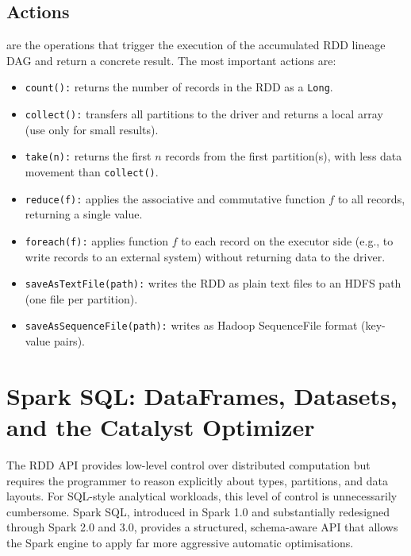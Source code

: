 \subsection{Actions}
\label{subsec:actions}

 are the operations that trigger the execution of the
accumulated RDD lineage DAG and return a concrete result. The most
important actions are:

\begin{itemize}
  \item \texttt{count():} returns the number of records in the RDD as a
        \texttt{Long}.
  \item \texttt{collect():} transfers all partitions to the driver and
        returns a local array (use only for small results).
  \item \texttt{take(n):} returns the first $n$ records from the first
        partition(s), with less data movement than \texttt{collect()}.
  \item \texttt{reduce(f):} applies the associative and commutative
        function $f$ to all records, returning a single value.
  \item \texttt{foreach(f):} applies function $f$ to each record on
        the executor side (e.g., to write records to an external system)
        without returning data to the driver.
  \item \texttt{saveAsTextFile(path):} writes the RDD as plain text
        files to an HDFS path (one file per partition).
  \item \texttt{saveAsSequenceFile(path):} writes as Hadoop SequenceFile
        format (key-value pairs).
\end{itemize}

\section{Spark SQL: DataFrames, Datasets, and the Catalyst Optimizer}
\label{sec:spark-sql}

The RDD API provides low-level control over distributed computation but
requires the programmer to reason explicitly about types, partitions, and
data layouts. For SQL-style analytical workloads, this level of control
is unnecessarily cumbersome. Spark SQL, introduced in Spark 1.0 and
substantially redesigned through Spark 2.0 and 3.0, provides a
structured, schema-aware API that allows the Spark engine to apply
far more aggressive automatic optimisations.

